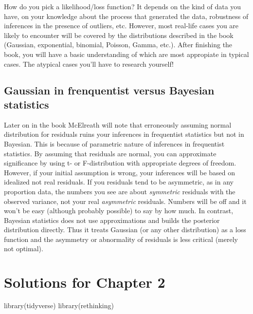 \documentclass[
]{book}
\newenvironment{Shaded}{\begin{snugshade}}{\end{snugshade}}
\newcommand{\FunctionTok}[1]{\textcolor[rgb]{0.00,0.00,0.00}{#1}}
\newcommand{\NormalTok}[1]{#1}
\begin{document}
How do you pick a likelihood/loss function? It depends on the kind of data you have, on your knowledge about the process that generated the data, robustness of inferences in the presence of outliers, etc. However, most real-life cases you are likely to encounter will be covered by the distributions described in the book (Gaussian, exponential, binomial, Poisson, Gamma, etc.). After finishing the book, you will have a basic understanding of which are most appropiate in typical cases. The atypical cases you'll have to research yourself!

\hypertarget{gaussian-in-frenquentist-versus-bayesian-statistics}{%
\section{Gaussian in frenquentist versus Bayesian statistics}\label{gaussian-in-frenquentist-versus-bayesian-statistics}}

Later on in the book McElreath will note that erroneously assuming normal distribution for residuals ruins your inferences in frequentist statistics but not in Bayesian. This is because of parametric nature of inferences in frequentist statistics. By assuming that residuals are normal, you can approximate significance by using t- or F-distribution with appropriate degrees of freedom. However, if your initial assumption is wrong, your inferences will be based on idealized not real residuals. If you residuals tend to be asymmetric, as in any proportion data, the numbers you see are about \emph{symmetric} residuals with the observed variance, not your real \emph{asymmetric} residuals. Numbers will be off and it won't be easy (although probably possible) to say by how much. In contrast, Bayesian statistics does not use approximations and builds the posterior distribution directly. Thus it treats Gaussian (or any other distribution) as a loss function and the asymmetry or abnormality of residuals is less critical (merely not optimal).

\hypertarget{solutions-for-chapter-2}{%
\chapter{Solutions for Chapter 2}\label{solutions-for-chapter-2}}

\begin{Shaded}
\begin{Highlighting}[]
\FunctionTok{library}\NormalTok{(tidyverse)}
\FunctionTok{library}\NormalTok{(rethinking)}
\end{Highlighting}
\end{Shaded}
\end{document}
